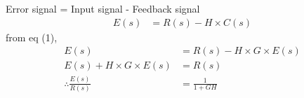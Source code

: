 \documentclass[journal,12pt,twocolumn]{IEEEtran}
\begin{document}
	 Error signal = Input signal - Feedback signal 
	\begin{align}
	      E(s) &= R(s) - H \times C(s)
	\end{align}
	from eq (1),     
	\begin{align}
		E(s) &= R(s) - H \times G \times E(s)\\
		E(s) +  H \times G \times E(s) &= R(s)\\
		\therefore \frac{E(s)}{R(s)} &= \frac{1}{1 + GH}
	\end{align} 
	
	
	
	
\end{document}
